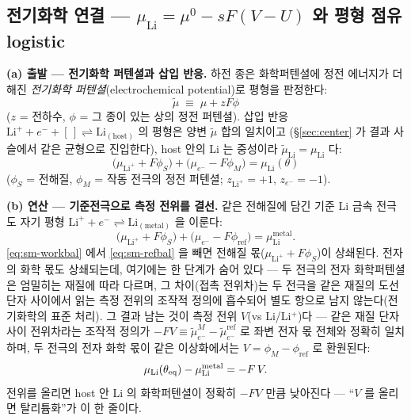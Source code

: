 \subsection{전기화학 연결 --- $\mu_\mathrm{Li}=\mu^0-sF(V-U)$ 와 평형 점유 logistic}\label{sec:sm-electro}
\textbf{(a) 출발 --- 전기화학 퍼텐셜과 삽입 반응.} 하전 종은 화학퍼텐셜에 정전 에너지가 더해진
\emph{전기화학 퍼텐셜}(electrochemical potential)로 평형을 판정한다:
\begin{equation}
\tilde\mu\;\equiv\;\mu+zF\phi
\label{eq:sm-emu}
\end{equation}
($z$ = 전하수, $\phi$ = 그 종이 있는 상의 정전 퍼텐셜). 삽입 반응
$\mathrm{Li}^++e^-+[\,]\rightleftharpoons\mathrm{Li}_{(\mathrm{host})}$ 의 평형은 양변 $\tilde\mu$ 합의 일치이고
(\S\ref{sec:center} 가 결과 사슬에서 같은 균형으로 진입한다), host 안의 Li 는 중성이라
$\tilde\mu_\mathrm{Li}=\mu_\mathrm{Li}$ 다:
\begin{equation}
\big(\mu_{\mathrm{Li}^+}+F\phi_S\big)+\big(\mu_{e^-}-F\phi_M\big)=\mu_\mathrm{Li}(\theta)
\label{eq:sm-workbal}
\end{equation}
($\phi_S$ = 전해질, $\phi_M$ = 작동 전극의 정전 퍼텐셜; $z_{\mathrm{Li}^+}{=}+1$, $z_{e^-}{=}-1$).

\textbf{(b) 연산 --- 기준전극으로 측정 전위를 결선.} 같은 전해질에 담긴 기준 Li 금속 전극도 자기 평형
$\mathrm{Li}^++e^-\rightleftharpoons\mathrm{Li}_{(\mathrm{metal})}$ 을 이룬다:
\begin{equation}
\big(\mu_{\mathrm{Li}^+}+F\phi_S\big)+\big(\mu_{e^-}-F\phi_\mathrm{ref}\big)=\mu_\mathrm{Li}^\mathrm{metal}.
\label{eq:sm-refbal}
\end{equation}
\eqref{eq:sm-workbal} 에서 \eqref{eq:sm-refbal} 을 빼면 전해질 몫($\mu_{\mathrm{Li}^+}+F\phi_S$)이
상쇄된다. 전자의 화학 몫도 상쇄되는데, 여기에는 한 단계가 숨어 있다 --- 두 전극의 전자 화학퍼텐셜은
엄밀히는 재질에 따라 다르며, 그 차이(접촉 전위차)는 두 전극을 같은 재질의 도선 단자 사이에서 읽는 측정
전위의 조작적 정의에 흡수되어 별도 항으로 남지 않는다(전기화학의 표준 처리). 그 결과 남는 것이 측정 전위 $V$(vs Li/Li$^+$)다 --- 같은 재질 단자 사이 전위차라는 조작적 정의가
$-FV\equiv\tilde\mu_{e^-}^{M}-\tilde\mu_{e^-}^{\mathrm{ref}}$ 로 좌변 전자 몫 전체와 정확히 일치하며,
두 전극의 전자 화학 몫이 같은 이상화에서는 $V=\phi_M-\phi_\mathrm{ref}$ 로 환원된다:
\begin{equation}
\mu_\mathrm{Li}(\theta_{\mathrm{eq}})-\mu_\mathrm{Li}^\mathrm{metal}=-F\,V.
\label{eq:sm-muV}
\end{equation}
전위를 올리면 host 안 Li 의 화학퍼텐셜이 정확히 $-FV$ 만큼 낮아진다 --- ``$V$ 를 올리면 탈리튬화''가 이 한 줄이다.


